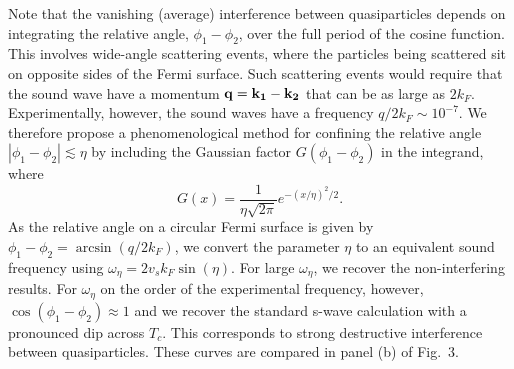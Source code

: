 	Note that the vanishing (average) interference between quasiparticles depends on integrating the relative angle, $\phi_1-\phi_2$, over the full period of the cosine function. This involves wide-angle scattering events, where the particles being scattered sit on opposite sides of the Fermi surface. Such scattering events would require that the sound wave have a momentum ${\bf q}={\bf k_1}-{\bf k_2}$ that can be as large as $2k_F$. Experimentally, however, the sound waves have a frequency $q/2k_F\sim 10^{-7}$. We therefore propose a phenomenological method for confining the relative angle $|\phi_1-\phi_2|\lesssim\eta$ by including the Gaussian factor $G(\phi_1-\phi_2)$ in the integrand, where
	\begin{equation}
	G(x)=\frac{1}{\eta\sqrt{2\pi}}e^{-(x/\eta)^2/2}.
	\end{equation}
	As the relative angle on a circular Fermi surface is given by $\phi_1-\phi_2=\arcsin(q/2k_F)$, we convert the parameter $\eta$ to an equivalent sound frequency using $\omega_\eta=2v_sk_F\sin(\eta)$. For large $\omega_\eta$, we recover the non-interfering results. For $\omega_\eta$ on the order of the experimental frequency, however, $\cos(\phi_1-\phi_2)\approx 1$ and we recover the standard s-wave calculation with a pronounced dip across $T_c$. This corresponds to strong destructive interference between quasiparticles. These curves are compared in panel (b) of Fig.~3.
	

